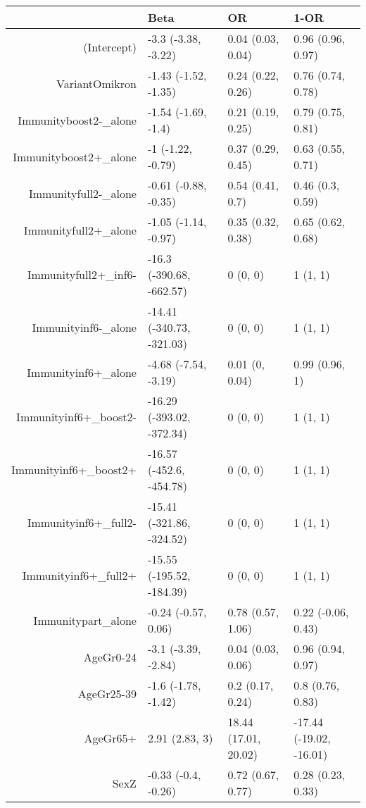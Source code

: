 \begin{table}[ht]
\centering
\begin{tabular}{rlll}
  \hline
 & Beta & OR & 1-OR \\ 
  \hline
(Intercept) & -3.3 (-3.38, -3.22) & 0.04 (0.03, 0.04) & 0.96 (0.96, 0.97) \\ 
  VariantOmikron & -1.43 (-1.52, -1.35) & 0.24 (0.22, 0.26) & 0.76 (0.74, 0.78) \\ 
  Immunityboost2-\_alone & -1.54 (-1.69, -1.4) & 0.21 (0.19, 0.25) & 0.79 (0.75, 0.81) \\ 
  Immunityboost2+\_alone & -1 (-1.22, -0.79) & 0.37 (0.29, 0.45) & 0.63 (0.55, 0.71) \\ 
  Immunityfull2-\_alone & -0.61 (-0.88, -0.35) & 0.54 (0.41, 0.7) & 0.46 (0.3, 0.59) \\ 
  Immunityfull2+\_alone & -1.05 (-1.14, -0.97) & 0.35 (0.32, 0.38) & 0.65 (0.62, 0.68) \\ 
  Immunityfull2+\_inf6- & -16.3 (-390.68, -662.57) & 0 (0, 0) & 1 (1, 1) \\ 
  Immunityinf6-\_alone & -14.41 (-340.73, -321.03) & 0 (0, 0) & 1 (1, 1) \\ 
  Immunityinf6+\_alone & -4.68 (-7.54, -3.19) & 0.01 (0, 0.04) & 0.99 (0.96, 1) \\ 
  Immunityinf6+\_boost2- & -16.29 (-393.02, -372.34) & 0 (0, 0) & 1 (1, 1) \\ 
  Immunityinf6+\_boost2+ & -16.57 (-452.6, -454.78) & 0 (0, 0) & 1 (1, 1) \\ 
  Immunityinf6+\_full2- & -15.41 (-321.86, -324.52) & 0 (0, 0) & 1 (1, 1) \\ 
  Immunityinf6+\_full2+ & -15.55 (-195.52, -184.39) & 0 (0, 0) & 1 (1, 1) \\ 
  Immunitypart\_alone & -0.24 (-0.57, 0.06) & 0.78 (0.57, 1.06) & 0.22 (-0.06, 0.43) \\ 
  AgeGr0-24 & -3.1 (-3.39, -2.84) & 0.04 (0.03, 0.06) & 0.96 (0.94, 0.97) \\ 
  AgeGr25-39 & -1.6 (-1.78, -1.42) & 0.2 (0.17, 0.24) & 0.8 (0.76, 0.83) \\ 
  AgeGr65+ & 2.91 (2.83, 3) & 18.44 (17.01, 20.02) & -17.44 (-19.02, -16.01) \\ 
  SexZ & -0.33 (-0.4, -0.26) & 0.72 (0.67, 0.77) & 0.28 (0.23, 0.33) \\ 
   \hline
\end{tabular}
\end{table}
